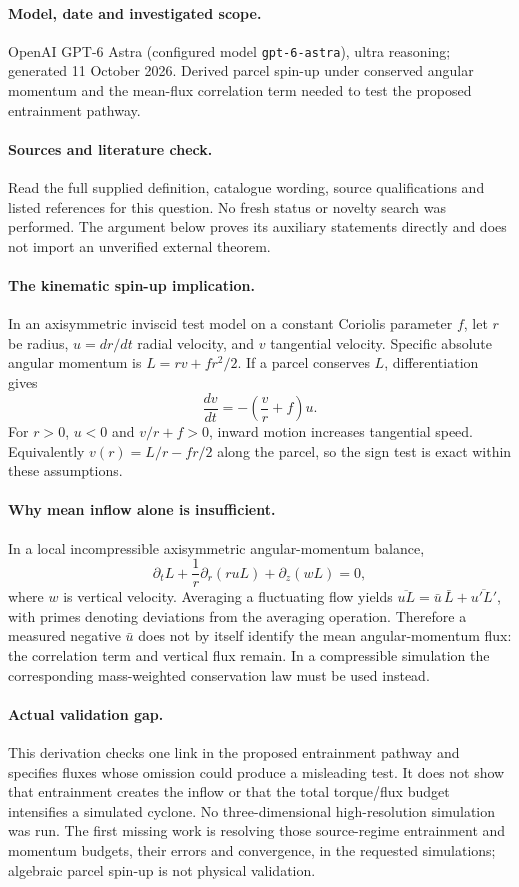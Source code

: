 \documentclass[11pt]{article}
\begin{document}
\paragraph{Model, date and investigated scope.}
OpenAI GPT-6 Astra (configured model \texttt{gpt-6-astra}), ultra reasoning; generated 11 October 2026. Derived parcel spin-up under conserved angular momentum and the mean-flux correlation term needed to test the proposed entrainment pathway.

\paragraph{Sources and literature check.}
Read the full supplied definition, catalogue wording, source qualifications and listed references for this question. No fresh status or novelty search was performed. The argument below proves its auxiliary statements directly and does not import an unverified external theorem.

\paragraph{The kinematic spin-up implication.} In an axisymmetric inviscid test model on a constant Coriolis parameter \(f\), let \(r\) be radius, \(u=dr/dt\) radial velocity, and \(v\) tangential velocity. Specific absolute angular momentum is \(L=rv+fr^2/2\). If a parcel conserves \(L\), differentiation gives
\[
 \frac{dv}{dt}=-\left(\frac vr+f\right)u.
\]
For \(r>0\), \(u<0\) and \(v/r+f>0\), inward motion increases tangential speed. Equivalently \(v(r)=L/r-fr/2\) along the parcel, so the sign test is exact within these assumptions.
\paragraph{Why mean inflow alone is insufficient.} In a local incompressible axisymmetric angular-momentum balance,
\[
 \partial_t L+\frac1r\partial_r(ruL)+\partial_z(wL)=0,
\]
where \(w\) is vertical velocity. Averaging a fluctuating flow yields \(\overline{uL}=\bar u\,\bar L+\overline{u'L'}\), with primes denoting deviations from the averaging operation. Therefore a measured negative \(\bar u\) does not by itself identify the mean angular-momentum flux: the correlation term and vertical flux remain. In a compressible simulation the corresponding mass-weighted conservation law must be used instead.
\paragraph{Actual validation gap.} This derivation checks one link in the proposed entrainment pathway and specifies fluxes whose omission could produce a misleading test. It does not show that entrainment creates the inflow or that the total torque/flux budget intensifies a simulated cyclone. No three-dimensional high-resolution simulation was run. The first missing work is resolving those source-regime entrainment and momentum budgets, their errors and convergence, in the requested simulations; algebraic parcel spin-up is not physical validation.
\end{document}
